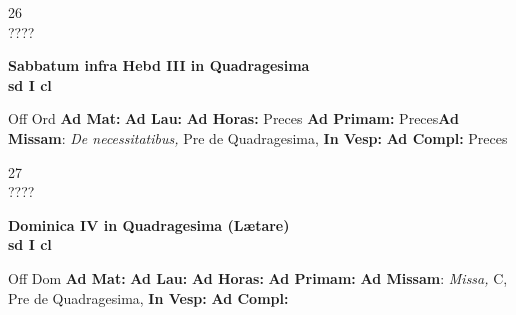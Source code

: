\documentclass[10pt, openany]{book}
\begin{document}
    \begin{center}
        \begin{minipage}{3.5in}
            \vspace{2em}
            \begin{minipage}{0.5in}
                {\Huge 26} \\
                {\normalsize ????}
            \end{minipage}
            \begin{minipage}{3.0in}
                \textbf{ \large Sabbatum infra Hebd III in Quadragesima \\
                \textnormal{\normalsize sd I cl}}

            \end{minipage}
            \begin{justify}Off Ord
                \textbf{Ad Mat: }
                \textbf{Ad Lau: }
                \textbf{Ad Horas: }Preces
                \textbf{Ad Primam: }Preces\textbf{Ad Missam}: \textit{De necessitatibus,} Pre de Quadragesima, 
                \textbf{In Vesp: }
                \textbf{Ad Compl: }Preces
            \end{justify}
        \end{minipage}
    \end{center}

    \begin{center}
        \begin{minipage}{3.5in}
            \vspace{2em}
            \begin{minipage}{0.5in}
                {\Huge 27} \\
                {\normalsize ????}
            \end{minipage}
            \begin{minipage}{3.0in}
                \textbf{ \large Dominica IV in Quadragesima (Lætare) \\
                \textnormal{\normalsize sd I cl}}

            \end{minipage}
            \begin{justify}Off Dom
                \textbf{Ad Mat: }
                \textbf{Ad Lau: }
                \textbf{Ad Horas: }
                \textbf{Ad Primam: }\textbf{Ad Missam}: \textit{Missa,} C, Pre de Quadragesima, 
                \textbf{In Vesp: }
                \textbf{Ad Compl: }
            \end{justify}
        \end{minipage}
    \end{center}
\end{document}
